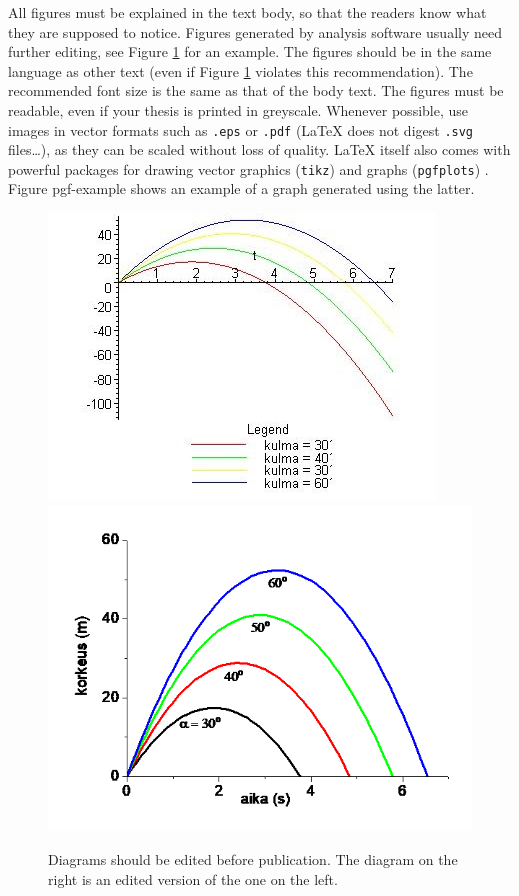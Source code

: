 All figures must be explained in the text body, so that the readers know what they are supposed to notice. Figures generated by analysis software usually need further editing, see Figure \ref{fig:huolittelu} for an example. The figures should be in the same language as other text (even if Figure \ref{fig:huolittelu} violates this recommendation). The recommended font size is the same as that of the body text. The figures must be readable, even if your thesis is printed in greyscale. Whenever possible, use images in vector formats such as \texttt{.eps} or \texttt{.pdf} (\LaTeX{} does not digest \texttt{.svg} files\ldots), as they can be scaled without loss of quality. \LaTeX{} itself also comes with powerful packages for drawing vector graphics (\texttt{tikz}) \parencite{tikz} and graphs (\texttt{pgfplots}) \parencite{pgfplots}. Figure pgf-example shows an example of a graph generated using the latter.

\begin{figure}
    \centering
    \includegraphics[width=\textwidth]{figures/bad-example}
    \includegraphics[width=\textwidth]{figures/good-example}
    \caption[This is a short caption.]{Diagrams should be edited before publication. The diagram on the right is an edited version of the one on the left.}
    \label{fig:huolittelu}
\end{figure}


